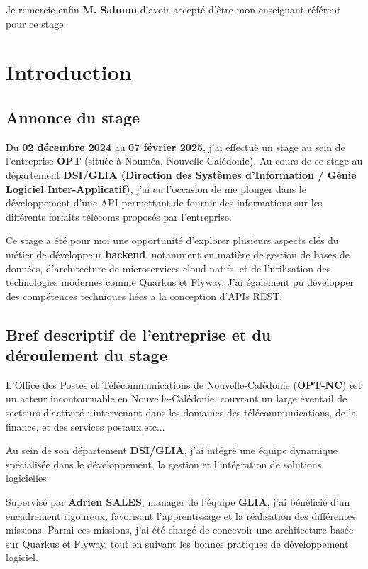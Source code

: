 \documentclass[11pt]{article}
\begin{document}
		Je remercie enfin \textbf{M. Salmon} d’avoir accepté d’être mon enseignant référent pour ce stage.
	
		\newpage
		\tableofcontents
		\newpage
		\section{Introduction}
		
		\subsection{Annonce du stage}
		
		Du \textbf{02 décembre 2024} au \textbf{07 février 2025}, j’ai effectué un stage au sein de l’entreprise \textbf{OPT} (située à Nouméa, Nouvelle-Calédonie). Au cours de ce stage au département \textbf{DSI/GLIA (Direction des Systèmes d'Information / Génie Logiciel Inter-Applicatif)}, j’ai eu l’occasion de me plonger dans le développement d’une API permettant de fournir des informations sur les différents forfaits télécoms proposés par l’entreprise.
		
		Ce stage a été pour moi une opportunité d’explorer plusieurs aspects clés du métier de développeur \textbf{backend}, notamment en matière de gestion de bases de données, d’architecture de microservices cloud natifs, et de l’utilisation des technologies modernes comme Quarkus et Flyway. J’ai également pu développer des compétences techniques liées a la conception d’APIs REST.
		
		\subsection{Bref descriptif de l’entreprise et du déroulement du stage}
		
		L’Office des Postes et Télécommunications de Nouvelle-Calédonie (\textbf{OPT-NC}) est un acteur incontournable en Nouvelle-Calédonie, couvrant un large éventail de secteurs d'activité : intervenant dans les domaines des télécommunications, de la finance, et des services postaux,etc...
		
		Au sein de son département \textbf{DSI/GLIA}, j’ai intégré une équipe dynamique spécialisée dans le développement, la gestion et l'intégration de solutions logicielles.
		
		
		Supervisé par \textbf{Adrien SALES}, manager de l’équipe \textbf{GLIA}, j’ai bénéficié d’un encadrement rigoureux, favorisant l’apprentissage et la réalisation des différentes missions. Parmi ces missions, j’ai été chargé de concevoir une architecture basée sur Quarkus et Flyway, tout en suivant les bonnes pratiques de développement logiciel.
		
\end{document}
